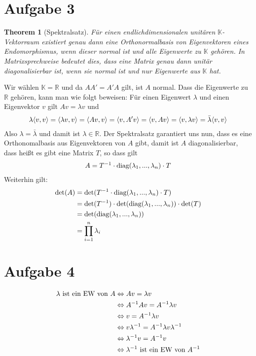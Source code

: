 \documentclass{article}
\newtheorem{thm}{Theorem}
\begin{document}
	\section*{Aufgabe 3}
	\begin{thm}[Spektralsatz]
		Für einen endlichdimensionalen unitären $\mathbb{K}$-Vektorraum existiert genau dann eine Orthonormalbasis von Eigenvektoren eines Endomorphismus, wenn dieser normal ist und alle Eigenwerte zu $\mathbb{K}$ gehören. In Matrixsprechweise bedeutet dies, dass eine Matrix genau dann unitär diagonalisierbar ist, wenn sie normal ist und nur Eigenwerte aus $\mathbb{K}$ hat.
	\end{thm}
	Wir wählen $\mathbb{K}=\mathbb{R}$ und da $AA' = A'A$ gilt, ist $A$ normal. Dass die Eigenwerte zu $\mathbb{R}$ gehören, kann man wie folgt beweisen: Für einen Eigenwert $\lambda$ und einen Eigenvektor $v$ gilt $Av=\lambda v$ und
	\begin{align}
		\lambda\langle v,v\rangle = \langle \lambda v,v\rangle = \langle Av,v\rangle = \langle v,A'v\rangle = \langle v,Av\rangle = \langle v,\lambda v\rangle = \bar{\lambda}\langle v,v\rangle \notag
	\end{align}
	Also $\lambda = \bar{\lambda}$ und damit ist $\lambda\in\mathbb{R}$. Der Spektralsatz garantiert uns nun, dass es eine Orthonomalbasis aus Eigenvektoren von $A$ gibt, damit ist $A$ diagonalisierbar, dass heißt es gibt eine Matrix $T$, so dass gilt
	\begin{align}
		A = T^{-1}\cdot \text{diag}(\lambda_1,...,\lambda_n) \cdot T \notag
	\end{align}
	Weiterhin gilt:
	\begin{align}
		\det(A) &= \det(T^{-1}\cdot \text{diag}(\lambda_1,...,\lambda_n) \cdot T) \notag \\
		&= \det(T^{-1}) \cdot \det(\text{diag}(\lambda_1,...,\lambda_n)) \cdot \det(T) \notag \\
		&= \det(\text{diag}(\lambda_1,...,\lambda_n)) \notag \\
		&= \prod_{i=1}^{n} \lambda_i \notag
	\end{align}
	
	\section*{Aufgabe 4}
	\begin{align}
		\lambda\text{ ist ein EW von } A &\Leftrightarrow Av = \lambda v \notag \\
		&\Leftrightarrow A^{-1}Av = A^{-1}\lambda v \notag \\
		&\Leftrightarrow v = A^{-1}\lambda v \notag \\
		&\Leftrightarrow v\lambda^{-1} = A^{-1}\lambda v\lambda^{-1} \notag \\
		&\Leftrightarrow \lambda^{-1}v = A^{-1}v \notag \\
		&\Leftrightarrow \lambda^{-1}\text{ ist ein EW von } A^{-1} \notag
	\end{align}
	
\end{document}
